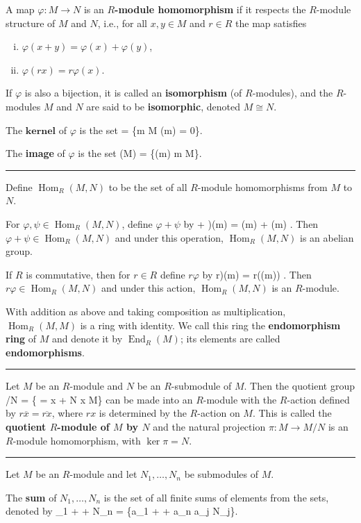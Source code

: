 \documentclass[12pt]{article}
\newcommand{\keyword}[1]{\textbf{#1}}
\def\[#1\]{\begin{align*}#1\end{align*}}
\newcommand{\sepline}{\rule{\textwidth}{0.4pt}}
\theoremstyle{definition}
\renewcommand{\phi}{\varphi}
\newcommand{\<}{\left\langle}
\renewcommand{\>}{\right\rangle}
\newcommand{\isom}{\cong}
\newcommand{\eqc}{\overline}
\DeclareMathOperator{\Hom}{Hom}
\DeclareMathOperator{\End}{End}
\begin{document}
A map $\phi : M \to N$ is an \keyword{$R$-module homomorphism} if it respects the $R$-module structure of $M$ and $N$, i.e., for all $x, y \in M$ and $r \in R$ the map satisfies
\begin{enumerate}[(i)]
    \item $\phi(x + y) = \phi(x) + \phi(y)$,
    \item $\phi(rx) = r\phi(x)$.
\end{enumerate}
If $\phi$ is also a bijection, it is called an \keyword{isomorphism} (of $R$-modules), and the $R$-modules $M$ and $N$ are said to be \keyword{isomorphic}, denoted $M \isom N$.

The $\keyword{kernel}$ of $\phi$ is the set
\[
    \ker\phi = \{m \in M \mid \phi(m) = 0\}.
\]

The \keyword{image} of $\phi$ is the set
\[
    \phi(M) = \{\phi(m) \mid m \in M\}.
\]

\sepline

Define $\Hom_R(M, N)$ to be the set of all $R$-module homomorphisms from $M$ to $N$.

For $\phi, \psi \in \Hom_R(M, N)$, define $\phi + \psi$ by
\[
    (\phi + \psi)(m) = \phi(m) + \psi(m) .
\]
Then $\phi + \psi \in \Hom_R(M, N)$ and under this operation, $\Hom_R(M, N)$ is an abelian group.

If $R$ is commutative, then for $r \in R$ define $r\phi$ by
\[
    (r\phi)(m) = r(\phi(m)) .
\]
Then $r\phi \in \Hom_R(M, N)$ and under this action, $\Hom_R(M, N)$ is an $R$-module.

With addition as above and taking composition as multiplication, $\Hom_R(M, M)$ is a ring with identity. We call this ring the \keyword{endomorphism ring} of $M$ and denote it by $\End_R(M)$; its elements are called \keyword{endomorphisms}.

\sepline

Let $M$ be an $R$-module and $N$ be an $R$-submodule of $M$. Then the quotient group
\[
    M/N = \{\eqc{x} = x + N \mid x \in M\}
\]
can be made into an $R$-module with the $R$-action defined by $r\eqc{x} = \eqc{rx}$, where $rx$ is determined by the $R$-action on $M$. This is called the \keyword{quotient $R$-module of $M$ by $N$} and the natural projection $\pi : M \to M/N$ is an $R$-module homomorphism, with $\ker\pi = N$.

\sepline

Let $M$ be an $R$-module and let $N_1, \dots, N_n$ be submodules of $M$.

The \keyword{sum} of $N_1, \dots, N_n$ is the set of all finite sums of elements from the sets, denoted by
\[
    N_1 + \cdots + N_n = \{a_1 + \cdots + a_n \mid a_j \in N_j\}.
\]
\end{document}
